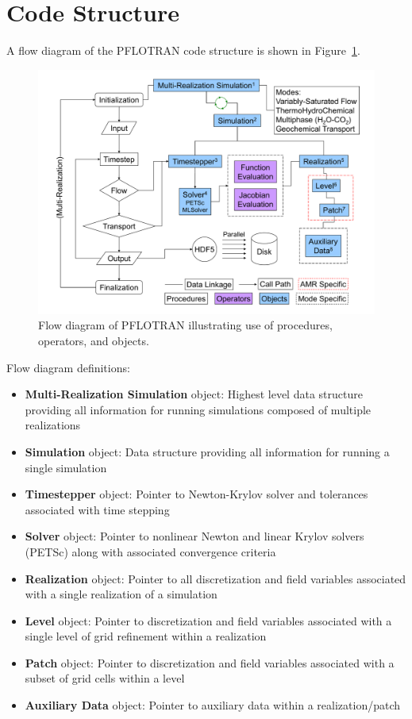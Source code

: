 \documentclass[12pt]{article}
\begin{document}
\newpage

\section{Code Structure}

A flow diagram of the PFLOTRAN code structure is shown in Figure~\ref{fdiag}.

\begin{figure}[h]\centering
\includegraphics[scale=0.3]{./figs/multi-realization_flowchart}
\caption{Flow diagram of PFLOTRAN illustrating use of procedures, operators, and objects.}\label{fdiag}
\end{figure}

Flow diagram definitions:
\begin{itemize}
\item {\bf Multi-Realization Simulation} object: Highest level data structure providing all information for running simulations composed of multiple realizations
\item {\bf Simulation} object: Data structure providing all information for running a single simulation
\item {\bf Timestepper} object: Pointer to Newton-Krylov solver and tolerances associated with time stepping
\item {\bf Solver} object: Pointer to nonlinear Newton and linear Krylov solvers (PETSc) along with associated convergence criteria
\item {\bf Realization} object: Pointer to all discretization and field variables associated with a single realization of a simulation
\item {\bf Level} object: Pointer to discretization and field variables associated with a single level of grid refinement within a realization
\item {\bf Patch} object: Pointer to discretization and field variables associated with a subset of grid cells within a level
\item {\bf Auxiliary Data} object: Pointer to auxiliary data within a realization/patch
\end{itemize}
\end{document}

